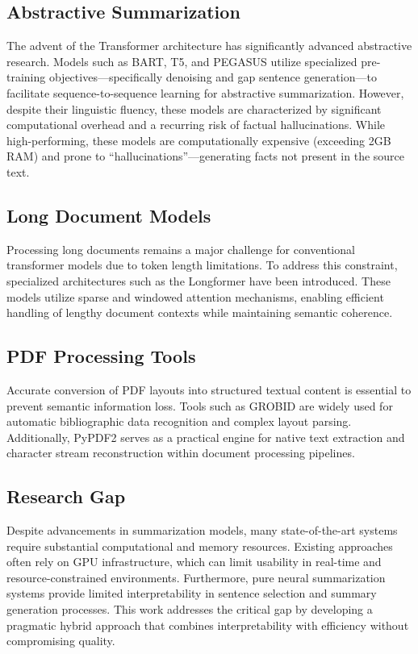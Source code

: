 \documentclass[conference]{IEEEtran}
\begin{document}
\subsection{Abstractive Summarization}

The advent of the Transformer architecture has significantly advanced abstractive research. Models such as BART, T5, and PEGASUS utilize specialized pre-training objectives—specifically denoising and gap sentence generation—to facilitate sequence-to-sequence learning for abstractive summarization. However, despite their linguistic fluency, these models are characterized by significant computational overhead and a recurring risk of factual hallucinations. While high-performing, these models are computationally expensive (exceeding 2GB RAM) and prone to ``hallucinations''—generating facts not present in the source text.

\subsection{Long Document Models}

Processing long documents remains a major challenge for conventional transformer models due to token length limitations. To address this constraint, specialized architectures such as the Longformer have been introduced. These models utilize sparse and windowed attention mechanisms, enabling efficient handling of lengthy document contexts while maintaining semantic coherence.

\subsection{PDF Processing Tools}

Accurate conversion of PDF layouts into structured textual content is essential to prevent semantic information loss. Tools such as GROBID are widely used for automatic bibliographic data recognition and complex layout parsing. Additionally, PyPDF2 serves as a practical engine for native text extraction and character stream reconstruction within document processing pipelines.

\subsection{Research Gap}

Despite advancements in summarization models, many state-of-the-art systems require substantial computational and memory resources. Existing approaches often rely on GPU infrastructure, which can limit usability in real-time and resource-constrained environments. Furthermore, pure neural summarization systems provide limited interpretability in sentence selection and summary generation processes. This work addresses the critical gap by developing a pragmatic hybrid approach that combines interpretability with efficiency without compromising quality.
\end{document}
